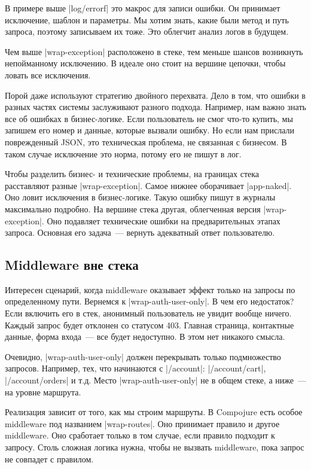 В примере выше \spverb|log/errorf| это макрос для записи ошибки. Он принимает
исключение, шаблон и параметры. Мы хотим знать, какие были метод и путь запроса,
поэтому записываем их тоже. Это облегчит анализ логов в будущем.

Чем выше \spverb|wrap-exception| расположено в стеке, тем меньше шансов
возникнуть непойманному исключению. В идеале оно стоит на вершине цепочки,
чтобы ловать все исключения.

Порой даже используют стратегию двойного перехвата. Дело в том, что ошибки в
разных частях системы заслуживают разного подхода. Например, нам важно знать все
об ошибках в бизнес-логике. Если пользователь не смог что-то купить, мы запишем
его номер и данные, которые вызвали ошибку. Но если нам прислали поврежденный
JSON, это техническая проблема, не связанная с бизнесом. В таком случае
исключение это норма, потому его не пишут в лог.

Чтобы разделить бизнес- и технические проблемы, на границах стека расставляют
разные \spverb|wrap-exception|. Самое нижнее оборачивает \spverb|app-naked|. Оно
ловит исключения в бизнес-логике. Такую ошибку пишут в журналы максимально
подробно. На вершине стека другая, облегченная версия \spverb|wrap-exception|.
Оно подавляет технические ошибки на предварительных этапах запроса. Основная его
задача~--- вернуть адекватный ответ пользователю.

\subsection{Middleware вне стека}

Интересен сценарий, когда middleware оказывает эффект только на запросы по
определенному пути. Вернемся к \spverb|wrap-auth-user-only|. В чем его
недостаток? Если включить его в стек, анонимный пользователь не увидит вообще
ничего. Каждый запрос будет отклонен со статусом 403. Главная страница,
контактные данные, форма входа~--- все будет недоступно. В этом нет никакого
смысла.

Очевидно, \spverb|wrap-auth-user-only| должен перекрывать только подмножество
запросов. Например, тех, что начинаются с \spverb|/account|:
\spverb|/account/cart|, \spverb|/account/orders| и т.д. Место
\spverb|wrap-auth-user-only| не в общем стеке, а ниже~--- на уровне маршрута.

Реализация зависит от того, как мы строим маршруты. В Compojure есть
особое middleware под названием \spverb|wrap-routes|. Оно принимает правило и
другое middleware. Оно сработает только в том случае, если правило подходит к
запросу. Столь сложная логика нужна, чтобы не вызвать middleware, пока запрос не
совпадет с правилом.


